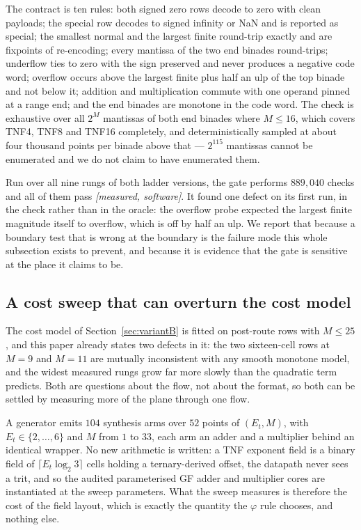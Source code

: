 \documentclass[11pt]{article}
\theoremstyle{definition}
\begin{document}
The contract is ten rules: both signed zero rows decode to zero with clean
payloads; the special row decodes to signed infinity or NaN and is reported as
special; the smallest normal and the largest finite round-trip exactly and are
fixpoints of re-encoding; every mantissa of the two end binades round-trips;
underflow ties to zero with the sign preserved and never produces a negative code
word; overflow occurs above the largest finite plus half an ulp of the top binade
and not below it; addition and multiplication commute with one operand pinned at a
range end; and the end binades are monotone in the code word. The check is
exhaustive over all $2^M$ mantissas of both end binades where $M \le 16$, which
covers TNF4, TNF8 and TNF16 completely, and deterministically sampled at about
four thousand points per binade above that --- $2^{115}$ mantissas cannot be
enumerated and we do not claim to have enumerated them.

Run over all nine rungs of both ladder versions, the gate performs $889{,}040$
checks and all of them pass \emph{[measured, software]}. It found one defect on
its first run, in the check rather than in the oracle: the overflow probe expected
the largest finite magnitude itself to overflow, which is off by half an ulp. We
report that because a boundary test that is wrong at the boundary is the failure
mode this whole subsection exists to prevent, and because it is evidence that the
gate is sensitive at the place it claims to be.

\subsection{A cost sweep that can overturn the cost model}
\label{sec:costsweep}

The cost model of Section~\ref{sec:variantB} is fitted on post-route rows with
$M \le 25$, and this paper already states two defects in it: the two sixteen-cell
rows at $M = 9$ and $M = 11$ are mutually inconsistent with any smooth monotone
model, and the widest measured rungs grow far more slowly than the quadratic term
predicts. Both are questions about the flow, not about the format, so both can be
settled by measuring more of the plane through one flow.

A generator emits $104$ synthesis arms over $52$ points of $(E_t, M)$, with
$E_t \in \{2,\dots,6\}$ and $M$ from $1$ to $33$, each arm an adder and a
multiplier behind an identical wrapper. No new arithmetic is written: a TNF
exponent field is a binary field of $\lceil E_t \log_2 3 \rceil$ cells holding a
ternary-derived offset, the datapath never sees a trit, and so the audited
parameterised GF adder and multiplier cores are instantiated at the sweep
parameters. What the sweep measures is therefore the cost of the field layout,
which is exactly the quantity the $\varphi$ rule chooses, and nothing else.
\end{document}
